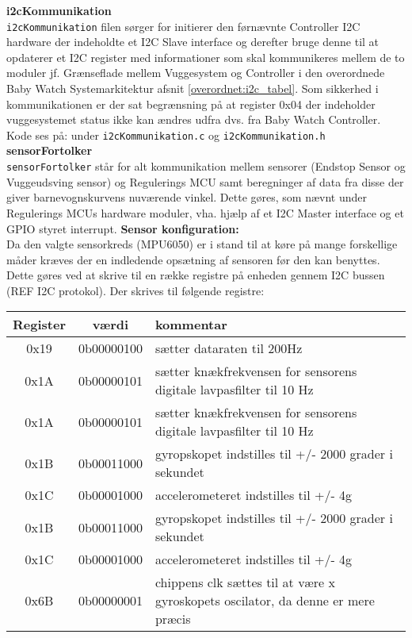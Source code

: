 \label{vugsys:impl, i2cKommunikation}\textbf{i2cKommunikation} \\ \verb+i2cKommunikation+ filen sørger for initierer den førnævnte Controller I2C hardware der indeholdte et I2C Slave interface og derefter bruge denne til at opdaterer et I2C register med informationer som skal kommunikeres mellem de to moduler jf. Grænseflade mellem Vuggesystem og Controller i den overordnede Baby Watch Systemarkitektur afsnit \ref{overordnet:i2c_tabel}. Som sikkerhed i kommunikationen er der sat begrænsning på at register 0x04 der indeholder vuggesystemet status ikke kan ændres udfra dvs. fra Baby Watch Controller. Kode ses på: \citep{cd} under \verb+i2cKommunikation.c+ og \verb+i2cKommunikation.h+\\

\label{vugsys:impl, sensFortolk}\textbf{sensorFortolker}  \\
\verb+sensorFortolker+ står for alt kommunikation mellem sensorer (Endstop Sensor og Vuggeudsving sensor) og Regulerings MCU samt beregninger af data fra disse der giver barnevognskurvens nuværende vinkel. Dette gøres, som nævnt under Regulerings MCUs hardware moduler, vha. hjælp af et I2C Master interface og et GPIO styret interrupt. 
\textbf{Sensor konfiguration:} \\
Da den valgte sensorkreds (MPU6050) er i stand til at køre på mange forskellige måder kræves der en indledende opsætning af sensoren før den kan benyttes. Dette gøres ved at skrive til en række registre på enheden gennem I2C bussen (REF I2C protokol). Der skrives til følgende registre:
\begin{center}
    \begin{tabular}{| c | c | p{8cm} |}
    \hline
    \textbf{Register}	& \textbf{værdi} & \textbf{kommentar} \\ \hline
    0x19 & 0b00000100 & sætter dataraten til 200Hz \\
    0x1A & 0b00000101 & sætter knækfrekvensen for sensorens digitale lavpasfilter til 10 Hz \\
    0x1A & 0b00000101 & sætter knækfrekvensen for sensorens digitale lavpasfilter til 10 Hz \\
    0x1B & 0b00011000 & gyropskopet indstilles til +/- 2000 grader i sekundet  \\
    0x1C & 0b00001000 & accelerometeret indstilles til +/- 4g \\
    0x1B & 0b00011000 & gyropskopet indstilles til +/- 2000 grader i sekundet  \\
    0x1C & 0b00001000 & accelerometeret indstilles til +/- 4g \\
    0x6B & 0b00000001 & chippens clk sættes til at være x gyroskopets oscilator, da denne er mere præcis \\ \hline
    \end{tabular}
\end{center}
